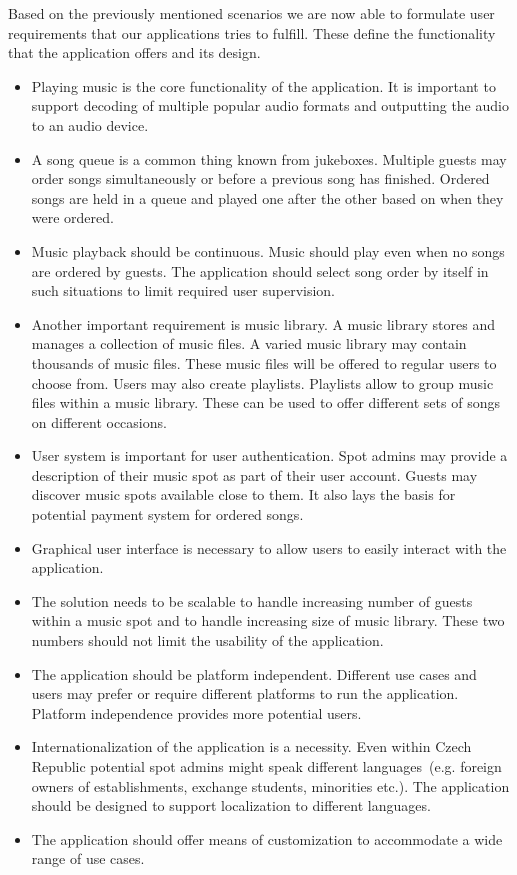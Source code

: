 Based on the previously mentioned scenarios we are now able to formulate user requirements that our applications tries to fulfill. These define the functionality that the application offers and its design. 
\begin{itemize}
    \item Playing music is the core functionality of the application. It is important to support decoding of multiple popular audio formats and outputting the audio to an audio device.
    \item A song queue is a common thing known from jukeboxes. Multiple guests may order songs simultaneously or before a previous song has finished. Ordered songs are held in a queue and played one after the other based on when they were ordered.
    \item Music playback should be continuous. Music should play even when no songs are ordered by guests. The application should select song order by itself in such situations to limit required user supervision.
    \item Another important requirement is music library. A music library stores and manages a collection of music files. A varied music library may contain thousands of music files. These music files will be offered to regular users to choose from. Users may also create playlists. Playlists allow to group music files within a music library. These can be used to offer different sets of songs on different occasions.
    \item User system is important for user authentication. Spot admins may provide a description of their music spot as part of their user account. Guests may discover music spots available close to them. It also lays the basis for potential payment system for ordered songs.
    \item Graphical user interface is necessary to allow users to easily interact with the application.
    \item The solution needs to be scalable to handle increasing number of guests within a music spot and to handle increasing size of music library. These two numbers should not limit the usability of the application.
    \item The application should be platform independent. Different use cases and users may prefer or require different platforms to run the application. Platform independence provides more potential users.
    \item Internationalization of the application is a necessity. Even within Czech Republic potential spot admins might speak different languages~(e.g. foreign owners of establishments, exchange students, minorities etc.). The application should be designed to support localization to different languages.
    \item The application should offer means of customization to accommodate a wide range of use cases.
\end{itemize}

